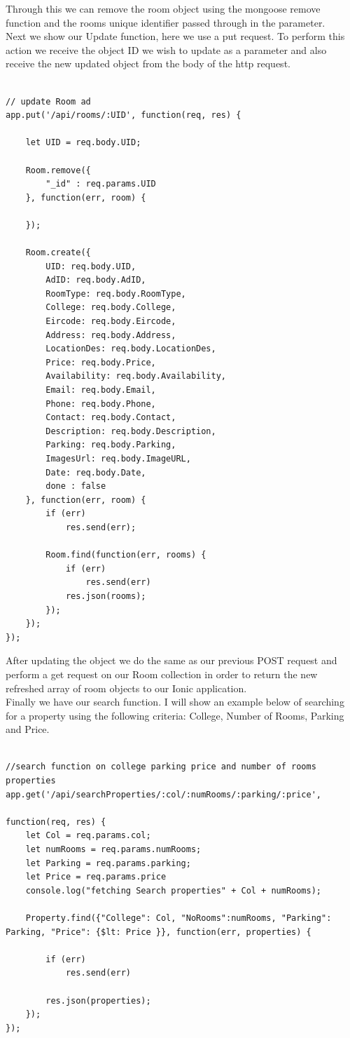 Through this we can remove the room object using the mongoose remove function and the rooms unique identifier passed through in the parameter.\\

Next we show our Update function, here we use a put request. To perform this action we receive the object ID we wish to update as a parameter and also receive the new updated object from the body of the http request.\\


\begin{verbatim}

// update Room ad
app.put('/api/rooms/:UID', function(req, res) {
	
	let UID = req.body.UID;
	
	Room.remove({
		"_id" : req.params.UID
	}, function(err, room) {

	});
	
	Room.create({
		UID: req.body.UID,
		AdID: req.body.AdID,
		RoomType: req.body.RoomType,
		College: req.body.College,
		Eircode: req.body.Eircode,
		Address: req.body.Address,
		LocationDes: req.body.LocationDes,
		Price: req.body.Price,
		Availability: req.body.Availability,
		Email: req.body.Email,
		Phone: req.body.Phone,
		Contact: req.body.Contact,
		Description: req.body.Description,
		Parking: req.body.Parking,
		ImagesUrl: req.body.ImageURL,
		Date: req.body.Date,
		done : false
	}, function(err, room) {
		if (err)
			res.send(err);

		Room.find(function(err, rooms) {
			if (err)
				res.send(err)
			res.json(rooms);
		});
	});
});

\end{verbatim}


After updating the object we do the same as our previous POST request and perform a get request on our Room collection in order to return the new refreshed array of room objects to our Ionic application.\\


Finally we have our search function. I will show an example below of searching for a property using the following criteria: College, Number of Rooms, Parking and Price.\\


\begin{verbatim}

//search function on college parking price and number of rooms properties
app.get('/api/searchProperties/:col/:numRooms/:parking/:price', 

function(req, res) {
	let Col = req.params.col;
	let numRooms = req.params.numRooms;
	let Parking = req.params.parking;
	let Price = req.params.price
	console.log("fetching Search properties" + Col + numRooms);

	Property.find({"College": Col, "NoRooms":numRooms, "Parking": Parking, "Price": {$lt: Price }}, function(err, properties) {

		if (err)
			res.send(err)

		res.json(properties); 
	});
});

\end{verbatim}


